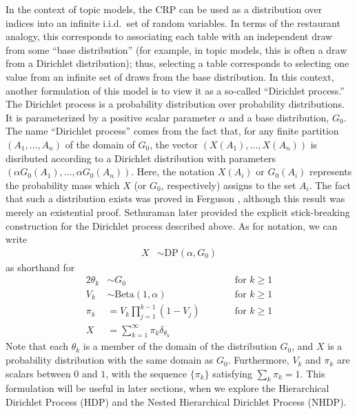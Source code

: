 \documentclass{article}
\begin{document}
In the context of topic models, the CRP can be used as a distribution over indices into an infinite i.i.d.\ set of random variables.
In terms of the restaurant analogy, this corresponds to associating each table with an independent draw from some ``base distribution'' (for example, in topic models, this is often a draw from a Dirichlet distribution); thus, selecting a table corresponds to selecting one value from an infinite set of draws from the base distribution.
In this context, another formulation of this model is to view it as a so-called ``Dirichlet process.''
The Dirichlet process is a probability distribution over probability distributions.
It is parameterized by a positive scalar parameter $\alpha$ and a base distribution, $G_0$.
The name ``Dirichlet process'' comes from the fact that, for any finite partition $(A_1, \ldots, A_n)$ of the domain of $G_0$, the vector $(X(A_1), \ldots, X(A_n))$ is disributed according to a Dirichlet distribution with parameters $(\alpha G_0(A_1), \ldots, \alpha G_0(A_n))$.
Here, the notation $X(A_i)$ or $G_0(A_i)$ represents the probability mass which $X$ (or $G_0$, respectively) assigns to the set $A_i$.
The fact that such a distribution exists was proved in Ferguson \cite{ferguson1973bayesian}, although this result was merely an existential proof.
Sethuraman \cite{sethuraman1994constructive} later provided the explicit stick-breaking construction for the Dirichlet process described above.
As for notation, we can write
\begin{align}
X &\sim \text{DP}(\alpha, G_0)
\end{align}
as shorthand for
\begin{alignat}{2}
\theta_k &\sim G_0 &\qquad& \text{for $k \geq 1$} \\
V_k &\sim \text{Beta}(1, \alpha) &\qquad& \text{for $k \geq 1$} \\
\pi_k &= V_k \prod_{j=1}^{k-1} (1 - V_j) &\qquad& \text{for $k \geq 1$} \\
X &= \sum_{k=1}^\infty \pi_k \delta_{\theta_k} &&
\end{alignat}
Note that each $\theta_k$ is a member of the domain of the distribution $G_0$, and $X$ is a probability distribution with the same domain as $G_0$.
Furthermore, $V_k$ and $\pi_k$ are scalars between $0$ and $1$, with the sequence $\{\pi_k\}$ satisfying $\sum_k \pi_k = 1$.
This formulation will be useful in later sections, when we explore the Hierarchical Dirichlet Process (HDP) and the Nested Hierarchical Dirichlet Process (NHDP).
\end{document}
